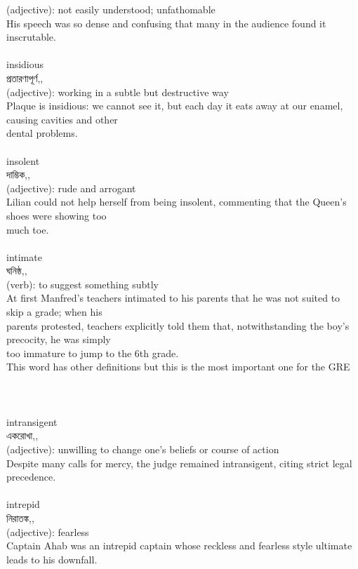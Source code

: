 \documentclass{article}
\begin{document}
{(adjective): not easily understood; unfathomable\\His speech was so dense and confusing that many in the audience found it inscrutable.\\}\\
{insidious}\\
{প্রতারণাপূর্ণ,,}\\
{(adjective): working in a subtle but destructive way\\Plaque is insidious: we cannot see it, but each day it eats away at our enamel, causing cavities and other\\dental problems.\\}\\
{insolent}\\
{দাম্ভিক,,}\\
{(adjective): rude and arrogant\\Lilian could not help herself from being insolent, commenting that the Queen's shoes were showing too\\much toe.\\}\\
{intimate}\\
{ঘনিষ্ঠ,,}\\
{(verb): to suggest something subtly\\At first Manfred's teachers intimated to his parents that he was not suited to skip a grade; when his\\parents protested, teachers explicitly told them that, notwithstanding the boy's precocity, he was simply\\too immature to jump to the 6th grade.\\This word has other definitions but this is the most important one for the GRE\\\\                                                                               \\}\\
{intransigent}\\
{একরোখা,,}\\
{(adjective): unwilling to change one's beliefs or course of action\\Despite many calls for mercy, the judge remained intransigent, citing strict legal precedence.\\}\\
{intrepid}\\
{নিরাতঙ্ক,,}\\
{(adjective): fearless\\Captain Ahab was an intrepid captain whose reckless and fearless style ultimate leads to his downfall.\\}\\
\end{document}
